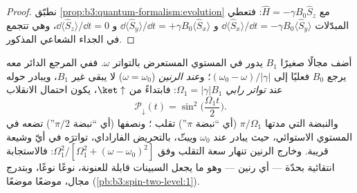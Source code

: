 \begin{proof}
نطبّق \cref{prop:b3:quantum-formalism:evolution} مع $\hat H =
-\gamma B_0\hat S_z$: فتعطي المبدّلات $\dd\langle\hat
S_x\rangle/\dd t = -\gamma B_0\langle\hat S_y\rangle$ و
$\dd\langle\hat S_y\rangle/\dd t = +\gamma B_0\langle\hat
S_x\rangle$ و $\dd\langle\hat S_z\rangle/\dd t = 0$، وهي
تتجمع في الجداء الشعاعي المذكور.
\end{proof}

\begin{proposition}\label{prop:b3:spin-two-level:rabi}
أضف مجالًا صغيرًا $B_1$ يدور في المستوي المستعرض بالتواتر
$\omega$. ففي المرجع الدائر معه يرجع $B_0$ فعليًا
إلى $(\omega_0 - \omega)/|\gamma|$؛ و\emph{عند الرنين}
($\omega = \omega_0$) لا يبقى غير $B_1$، ويبادر 
حوله عند \emph{تواتر رابي} $\Omega_1 =
|\gamma|B_1$: فابتداءً من $\ket\uparrow$، يكون احتمال
الانقلاب
\[
\mathcal P_\downarrow(t) = \sin^2\Big(\frac{\Omega_1t}{2}\Big) .
\]
والنبضة التي مدتها $\pi/\Omega_1$ (أي ``نبضة $\pi$'') تقلب
؛ ونصفها (أي ``نبضة $\pi/2$'') تضعه في المستوي الاستوائي،
حيث يبادر عند $\omega_0$ و\emph{يبثّ}، بالتحريض الفاراداي،
تواترَه في أيّ وشيعة قريبة. وخارج الرنين
تنهار سعة التقلب وفق $\Omega_1^2/[\Omega_1^2 +
(\omega - \omega_0)^2]$: فالاستجابة انتقائية بحدّة --- أي
رنين --- وهو ما يجعل السبينات قابلة للعنونة،
نوعًا نوعًا، وبتدرج مجال، موضعًا موضعًا
(\cref{pb:b3:spin-two-level:1}).
\end{proposition}
\admitted

